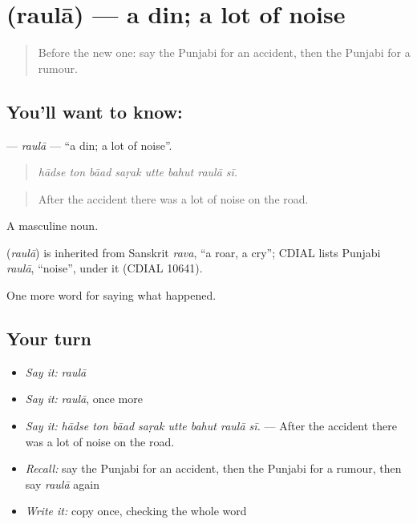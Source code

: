 \section[\texorpdfstring{\pa{ਰੌਲਾ} (raulā)}{ਰੌਲਾ (raulā)}]{ (raulā) — a din; a lot of noise}

\label{lesson:PA-C309-raula}



\begin{quote}
Before the new one: say the Punjabi for an accident, then the Punjabi for a rumour.
\end{quote}

\subsection*{You'll want to know: }
\textbf{} — \emph{raulā} — \textquotedblleft{}a din; a lot of noise\textquotedblright{}.

\begin{quote}
       
\end{quote}

\begin{quote}
\emph{hādse ton bāad saṛak utte bahut raulā sī.}
\end{quote}

\begin{quote}
After the accident there was a lot of noise on the road.
\end{quote}

A masculine noun.

\begin{cousinweb}
\textbf{} (\emph{raulā}) is inherited from Sanskrit \emph{rava}, \textquotedblleft{}a roar, a cry\textquotedblright{}; CDIAL lists Punjabi \emph{raulā}, \textquotedblleft{}noise\textquotedblright{}, under it (CDIAL 10641).
\end{cousinweb}

\begin{grammarlens}[title={What you've built}]
One more word for saying what happened.
\end{grammarlens}

\subsection*{Your turn}
\begin{itemize}
\raggedright
  \item \emph{Say it:} \emph{raulā}
  \item \emph{Say it:} \emph{raulā}, once more
  \item \emph{Say it:} \emph{hādse ton bāad saṛak utte bahut raulā sī.} — After the accident there was a lot of noise on the road.
  \item \emph{Recall:} say the Punjabi for an accident, then the Punjabi for a rumour, then say \emph{raulā} again
  \item \emph{Write it:} copy \textbf{} once, checking the whole word
\end{itemize}

